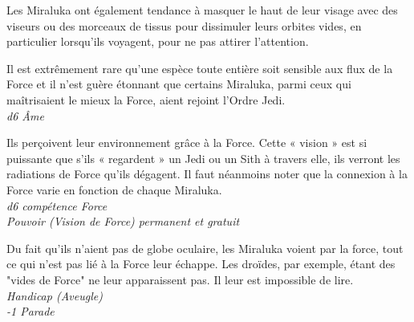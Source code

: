 Les Miraluka ont également tendance à masquer le haut de leur visage avec des viseurs ou des morceaux de tissus pour dissimuler leurs orbites vides, en particulier lorsqu’ils voyagent, pour ne pas attirer l’attention.


\begin{description}[align=left]
\item [Sensibilité raciale à la force] 	%
		Il est extrêmement rare qu’une espèce toute entière soit sensible aux flux de la Force et il n’est guère étonnant que certains Miraluka, parmi ceux qui maîtrisaient le mieux la Force, aient rejoint l’Ordre Jedi.\\
		\emph{d6 \^Ame}

\item [Vision de force] 			%
		Ils perçoivent leur environnement grâce à la Force. Cette « vision » est si puissante que s’ils « regardent » un Jedi ou un Sith à travers elle, ils verront les radiations de Force qu’ils dégagent. Il faut néanmoins noter que la connexion à la Force varie en fonction de chaque Miraluka.\\
		\emph{d6 compétence Force}\\
		\emph{Pouvoir (Vision de Force) permanent et gratuit}

\item [Aveugle dans la lumière] 	%
		Du fait qu’ils n’aient pas de globe oculaire, les Miraluka voient par la force, tout ce qui n’est pas lié à la Force leur échappe. Les droïdes, par exemple, étant des "vides de Force" ne leur apparaissent pas. Il leur est impossible de lire.\\
		\emph{Handicap (Aveugle)}\\
		\emph{-1 Parade}
\end{description}